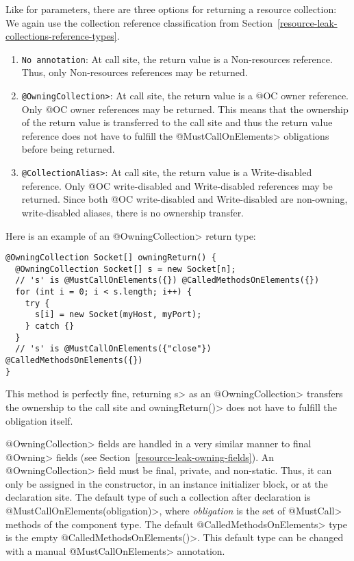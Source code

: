 Like for parameters, there are three options for returning a resource collection:
We again use the collection reference classification from Section~\ref{resource-leak-collections-reference-types}.
\begin{enumerate}
  \item \texttt{No annotation}: At call site, the return value is a Non-resources reference. Thus, only Non-resources references may be returned.
  \item \texttt{\<@OwningCollection>}: At call site, the return value is a @OC owner reference. Only @OC owner references may be returned. This means that the ownership of the return value is transferred to the call site and thus the return value reference does not have to fulfill the \<@MustCallOnElements> obligations before being returned.
  \item \texttt{\<@CollectionAlias>}: At call site, the return value is a Write-disabled reference. Only @OC write-disabled and Write-disabled references may be returned. Since both @OC write-disabled and Write-disabled are non-owning, write-disabled aliases, there is no ownership transfer.
\end{enumerate}

Here is an example of an \<@OwningCollection> return type:
\begin{verbatim}
@OwningCollection Socket[] owningReturn() {
  @OwningCollection Socket[] s = new Socket[n];
  // 's' is @MustCallOnElements({}) @CalledMethodsOnElements({})
  for (int i = 0; i < s.length; i++) {
    try {
      s[i] = new Socket(myHost, myPort);
    } catch {}
  }
  // 's' is @MustCallOnElements({"close"}) @CalledMethodsOnElements({})
}
\end{verbatim}

This method is perfectly fine, returning \<s> as an \<@OwningCollection> transfers the ownership to the call site and \<owningReturn()> does not have to fulfill the obligation itself.

\<@OwningCollection> fields are handled in a very similar manner to final \<@Owning> fields (see Section~\ref{resource-leak-owning-fields}).
An \<@OwningCollection> field must be final, private, and non-static. Thus, it
can only be assigned in the constructor, in an instance initializer block, or at the declaration site.
The default type of such a collection after declaration is \<@MustCallOnElements(obligation)>, where \textit{obligation} is the set of \<@MustCall> methods of the component type. The default \<@CalledMethodsOnElements> type is the empty \<@CalledMethodsOnElements({})>. This default type can be changed with a manual \<@MustCallOnElements> annotation.

